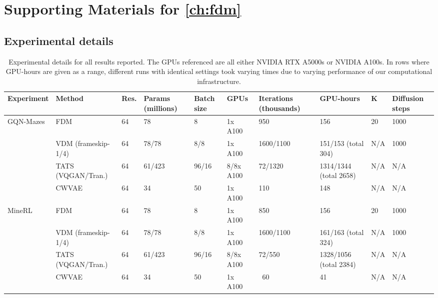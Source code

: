 \chapter{Supporting Materials for \cref{ch:fdm}}

\section{Experimental details}
\begin{table}[t]
  \tiny
  \caption{Experimental details for all results reported. The GPUs referenced are all either NVIDIA RTX A5000s or NVIDIA A100s. In rows where GPU-hours are given as a range, different runs with identical settings took varying times due to varying performance of our computational infrastructure.}
  \label{tab:fdm-experimental-details}
  \centering
  \begin{tabular}{p{1.1cm}llp{0.9cm}p{0.6cm}lp{1cm}llp{0.7cm}}
    \toprule
     Experiment  & Method & Res.  & Params (millions)  & Batch size  &  GPUs  & Iterations (thousands)  &  GPU-hours &  K  & Diffusion steps   \\
    \midrule
    \multirow{4}{*}{GQN-Mazes}         &  FDM                       & 64    & 78    & 8     & 1x A100   & 950       & 156      & 20    & 1000      \\
                                       &  VDM (frameskip-1/4)       & 64    & 78/78 & 8/8   & 1x A100   & 1600/1100 & 151/153 (total 304)   & N/A  & 1000      \\
                                       &  TATS (VQGAN/Tran.)       & 64    & 61/423     & 96/16 & 8/8x A100 & 72/1320   & 1314/1344 (total 2658)    & N/A  & N/A      \\
                                       &  CWVAE                     & 64    & 34    & 50    & 1x A100   & 110    & 148   & N/A   & N/A       \\
   \midrule
    \multirow{4}{*}{MineRL}            &  FDM                       & 64    & 78    & 8     & 1x A100   & 850       & 156      & 20    & 1000      \\
                                       &  VDM (frameskip-1/4)       & 64    & 78/78 & 8/8   & 1x A100   & 1600/1100 & 161/163 (total 324)   & N/A  & 1000      \\
                                       &  TATS (VQGAN/Tran.)       & 64    & 61/423     & 96/16 & 8/8x A100   & 72/550    & 1328/1056 (total 2384)     & N/A  & N/A      \\
                                       &  CWVAE                     & 64    & 34    & 50    & 1x A100   & ~60   & 41    & N/A    & N/A      \\

\end{tabular}
\end{table}
